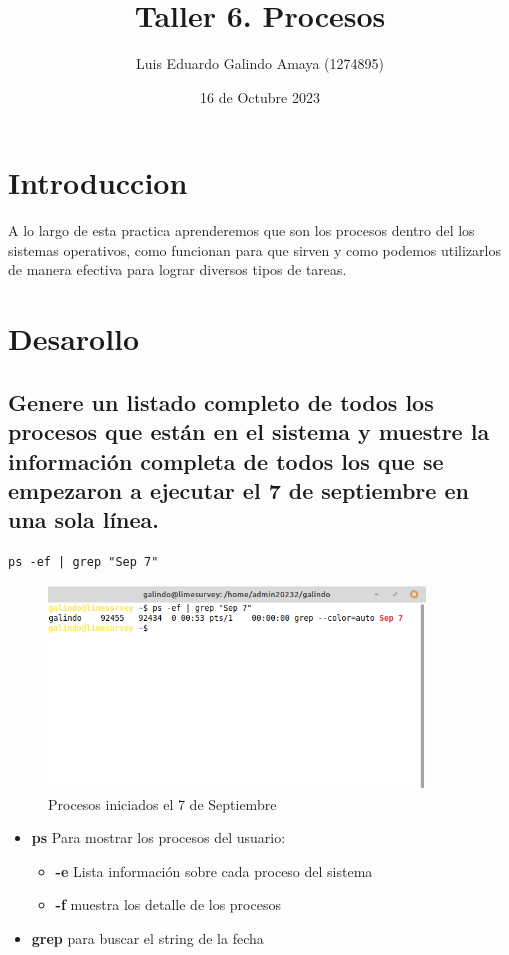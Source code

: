 \documentclass[11pt]{article}
\author{Luis Eduardo Galindo Amaya (1274895)}
\date{16 de Octubre 2023}
\title{Taller 6. Procesos}
\begin{document}
\tableofcontents\pagebreak
{}

\section{Introduccion}
\label{sec:orgdf7bf91}
A lo largo de esta practica aprenderemos que son los procesos dentro del los 
sistemas operativos, como funcionan para que sirven y como podemos utilizarlos 
de manera efectiva para lograr diversos tipos de tareas. 
\pagebreak

\section{Desarollo}
\label{sec:org78f6ccd}
\subsection{Genere un listado completo de todos los procesos que están en el sistema y muestre la información completa de todos los que se empezaron a ejecutar el 7 de septiembre en una sola línea.}
\label{sec:orga1d15be}

\begin{verbatim}
ps -ef | grep "Sep 7"
\end{verbatim}

\begin{figure}[htbp]
\centering
\includegraphics[width=10cm]{img/1.png}
\caption{Procesos iniciados el 7 de Septiembre}
\end{figure}

\begin{itemize}
\item \textbf{ps} Para mostrar los procesos del usuario:
\begin{itemize}
\item \textbf{-e} Lista información sobre cada proceso del sistema
\item \textbf{-f} muestra los detalle de los procesos
\end{itemize}

\item \textbf{grep} para buscar el string de la fecha
\end{itemize}
\end{document}
